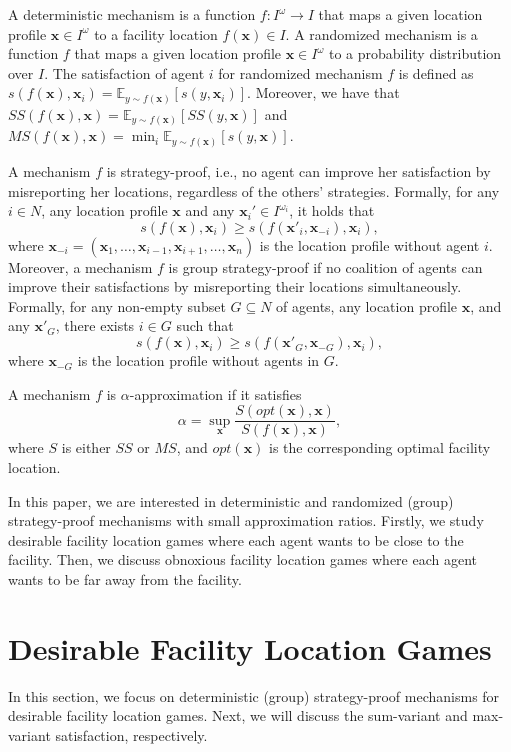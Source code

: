 \documentclass[runningheads]{11llncst}
\begin{document}
A deterministic mechanism is a function $f : I^\omega \to I$ that maps a given location profile $\textbf{x}\in I^\omega$ to a facility location $f(\textbf{x})\in I$. A randomized mechanism is a function $f$ that maps a given location profile $\textbf{x}\in I^\omega$  to a probability distribution  over $I$. The satisfaction  of agent $i$ for randomized mechanism $f$ is defined as  $s(f(\textbf{x}), \textbf{x}_i) = \mathbb{E}_{y\sim f(\textbf{x})}[s(y,\textbf{x}_i)]$. Moreover, we have that $SS(f(\textbf{x}),\textbf{x})=\mathbb{E}_{y\sim f(\textbf{x})}[SS(y,\textbf{x})] $ and $MS(f(\textbf{x}),\textbf{x})=\min_i\mathbb{E}_{y\sim f(\textbf{x})}[s(y,\textbf{x})] $. 



A mechanism $f$ is strategy-proof, i.e., no agent can improve  her satisfaction by misreporting her locations, regardless of the others' strategies. Formally, for any $i\in N$, any location profile $\textbf{x}$ and any $\textbf{x}_i' \in I^{\omega_i}$, it holds  that $$s(f(\textbf{x}), \textbf{x}_i) \geq s(f(\textbf{x}'_i, \textbf{x}_{-i}), \textbf{x}_i),$$ where $\textbf{x}_{-i}= (\textbf{x}_1,\dots, \textbf{x}_{i-1}, \textbf{x}_{i+1},\dots, \textbf{x}_n)$ is the location profile without agent $i$. Moreover, a mechanism $f$ is group strategy-proof if no coalition of agents can improve their satisfactions by misreporting their locations simultaneously. Formally, for any non-empty subset $G \subseteq N$ of agents, any location profile $\textbf{x}$,  and  any $\textbf{x}'
_G$, there exists $i \in G$ such that  $$s(f(\textbf{x}), \textbf{x}_i) \geq s(f(\textbf{x}'_G, \textbf{x}_{-G}), \textbf{x}_i),$$  where $\textbf{x}_{-G}$ is the location profile without agents in $G$. 
 

 A mechanism $f$ is $\alpha$-approximation if it satisfies
\begin{equation*}
    \alpha=\sup_{\textbf{x}}\frac{S(opt(\textbf{x}),\textbf{x})}{S(f(\textbf{x}), \textbf{x})},
\end{equation*}
where $S$ is either $SS$ or $MS$, and $opt(\textbf{x})$ is the corresponding optimal facility location. 

In this paper, we are interested in deterministic and randomized (group) strategy-proof mechanisms with small approximation ratios. Firstly, we study desirable facility location games where each agent wants  to be close to the facility. Then, we discuss obnoxious facility location games where each agent wants  to be far away from the facility.


\section{Desirable Facility Location Games}
In this section, we focus on deterministic (group) strategy-proof mechanisms for  desirable facility location games. Next, we will discuss the sum-variant  and  max-variant satisfaction, respectively.
\end{document}
